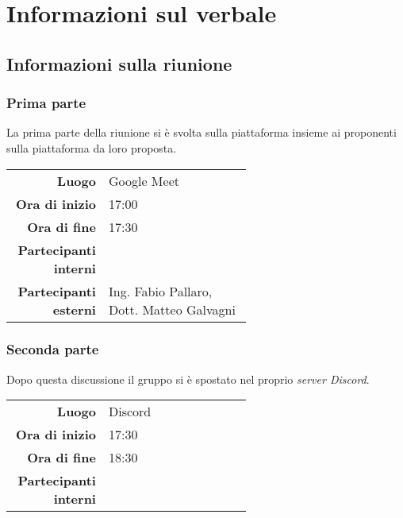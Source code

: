 \section{Informazioni sul verbale}

\subsection{Informazioni sulla riunione}

\subsubsection{Prima parte}
La prima parte della riunione si è svolta sulla piattaforma insieme ai proponenti sulla piattaforma da loro proposta.

\begin{center}
	\begin{tabular}{r|p{0.6\linewidth}}
		\toprule
		\textbf{Luogo} & Google Meet \\
		\textbf{Ora di inizio} & 17:00 \\
		\textbf{Ora di fine} & 17:30 \\
		\textbf{Partecipanti interni} & \groupTeam \\
		\textbf{Partecipanti esterni} & Ing. Fabio Pallaro, Dott. Matteo Galvagni
	\end{tabular}
\end{center}

\subsubsection{Seconda parte}
Dopo questa discussione il gruppo si è spostato nel proprio \textit{server Discord}.

\begin{center}
	\begin{tabular}{r|p{0.6\linewidth}}
		\toprule
		\textbf{Luogo} & Discord \\
		\textbf{Ora di inizio} & 17:30 \\
		\textbf{Ora di fine} & 18:30 \\
		\textbf{Partecipanti interni} & \groupTeam
	\end{tabular}
\end{center}

\medskip

